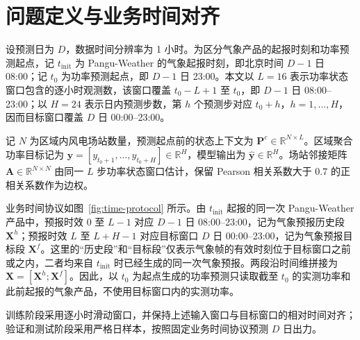 \section{问题定义与业务时间对齐}

设预测日为 \(D\)，数据时间分辨率为 1 小时。为区分气象产品的起报时刻和功率预测起点，记 \(t_{\mathrm{init}}\) 为 Pangu-Weather 的气象起报时刻，即北京时间 \(D-1\) 日 08:00；记 \(t_0\) 为功率预测起点，即 \(D-1\) 日 23:00。本文以 \(L=16\) 表示功率状态窗口包含的逐小时观测数，该窗口覆盖 \(t_0-L+1\) 至 \(t_0\)，即 \(D-1\) 日 08:00--23:00；以 \(H=24\) 表示日内预测步数，第 \(h\) 个预测步对应 \(t_0+h\)，\(h=1,\ldots,H\)，因而目标窗口覆盖 \(D\) 日 00:00--23:00。

记 \(N\) 为区域内风电场站数量，预测起点前的状态上下文为 \(\mathbf{P}^{c}\in\mathbb{R}^{N\times L}\)。区域聚合功率目标记为 \(\mathbf{y}=[y_{t_0+1},\ldots,y_{t_0+H}]\in\mathbb{R}^{H}\)，模型输出为 \(\hat{\mathbf{y}}\in\mathbb{R}^{H}\)。场站邻接矩阵 \(\mathbf{A}\in\mathbb{R}^{N\times N}\) 由同一 \(L\) 步功率状态窗口估计，保留 Pearson 相关系数大于 0.7 的正相关系数作为边权。

业务时间协议如图~\ref{fig:time-protocol} 所示。由 \(t_{\mathrm{init}}\) 起报的同一次 Pangu-Weather 产品中，预报时效 0 至 \(L-1\) 对应 \(D-1\) 日 08:00--23:00，记为气象预报历史段 \(\mathbf{X}^{h}\)；预报时效 \(L\) 至 \(L+H-1\) 对应目标窗口 \(D\) 日 00:00--23:00，记为气象预报目标段 \(\mathbf{X}^{f}\)。这里的“历史段”和“目标段”仅表示气象帧的有效时刻位于目标窗口之前或之内，二者均来自 \(t_{\mathrm{init}}\) 时已经生成的同一次气象预报。两段沿时间维拼接为 \(\mathbf{X}=[\mathbf{X}^{h};\mathbf{X}^{f}]\)。因此，以 \(t_0\) 为起点生成的功率预测只读取截至 \(t_0\) 的实测功率和此前起报的气象产品，不使用目标窗口内的实测功率。

训练阶段采用逐小时滑动窗口，并保持上述输入窗口与目标窗口的相对时间对齐；验证和测试阶段采用严格日样本，按照固定业务时间协议预测 \(D\) 日出力。

